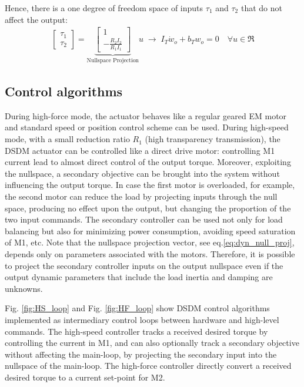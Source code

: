 % 
Hence, there is a one degree of freedom space of inputs $\tau_1$ and $\tau_2$ that do not affect the output:
\begin{align}
\left[ \begin{array}{c}
\tau_1 \\
\tau_2
\end{array} \right]
 = 
\underbrace{\left[ \begin{array}{c}
1 \\
-\frac{R_2 I_2}{R_1 I_1} 
\end{array} \right]}_{\text{Nullspace Projection}} u
\; \rightarrow \;
I_T \dot{w}_o +
b_T  w_o = 0 \quad \forall u \in \Re
\label{eq:dyn_null_proj}
\end{align}



\subsection{Control algorithms}

During high-force mode, the actuator behaves like a regular geared EM motor and standard speed or position control scheme can be used. During high-speed mode, with a small reduction ratio $R_1$ (high transparency transmission), the DSDM actuator can be controlled like a direct drive motor: controlling M1 current lead to almost direct control of the output torque. Moreover, exploiting the nullspace, a secondary objective can be brought into the system without influencing the output torque. In case the first motor is overloaded, for example, the second motor can reduce the load by projecting inputs through the null space, producing no effect upon the output, but changing the proportion of the two input commands. The secondary controller can be used not only for load balancing but also for minimizing power consumption, avoiding speed saturation of M1, etc. Note that the nullspace projection vector, see eq.\eqref{eq:dyn_null_proj}, depends only on parameters associated with the motors. Therefore, it is possible to project the secondary controller inputs on the output nullspace even if the output dynamic parameters that include the load inertia and damping are unknowns. 

Fig. \ref{fig:HS_loop} and Fig. \ref{fig:HF_loop} show DSDM control algorithms implemented as intermediary control loops between hardware and high-level commands. The high-speed controller tracks a received desired torque by controlling the current in M1, and can also optionally track a secondary objective without affecting the main-loop, by projecting the secondary input into the nullspace of the main-loop. The high-force controller directly convert a received desired torque to a current set-point for M2.

